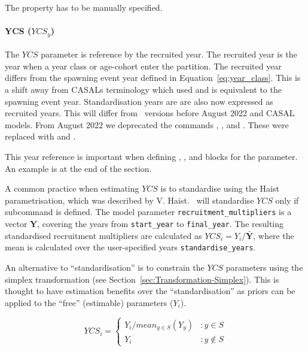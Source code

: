 The property  has to be manually specified.

\paragraph*{YCS ($YCS_y$)}

The $YCS$ parameter is reference by the recruited year. The recruited year is the year when a year class or age-cohort enter the partition. The recruited year differs from the spawning event year defined in Equation~\eqref{eq:year_class}. This is a shift away from CASALs terminology which used  and is equivalent to the spawning event year. Standardisation years are are also now expressed as recruited years. This will differ from \CNAME\ versions before August 2022 and CASAL models. From August 2022 we deprecated the commands , , and . These were replaced with  and .

This year reference is important when defining , , and  blocks for the  parameter. An example is at the end of the section.

A common practice when estimating $YCS$ is to standardise using the Haist parametrisation, which was described by V. Haist. \CNAME\ will standardise $YCS$ only if subcommand  is defined. The model parameter \texttt{recruitment\_multipliers} is a vector \textbf{Y}, covering the years from \texttt{start\_year} to \texttt{final\_year}. The resulting standardised recruitment multipliers are calculated as $YCS_i=Y_i/\bar{\textbf{Y}}$, where the mean is calculated over the user-specified years \texttt{standardise\_years}.

An alternative to \enquote{standardisation} is to constrain the $YCS$ parameters using the simplex transformation (see Section~\ref{sec:Transformation-Simplex}). This is thought to have estimation benefits over the \enquote{standardisation} as priors can be applied to the \enquote{free} (estimable) parameters (\(Y_i\)).

\[
YCS_i =
\begin{cases}
Y_i / mean_{y \in S}(Y_y) & :y \in S\\
Y_i					 & :y \notin S
\end{cases}
\]

